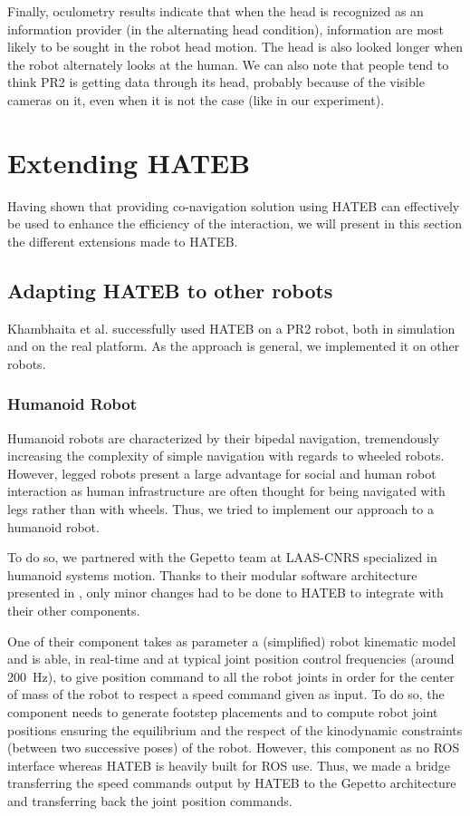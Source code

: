 \documentclass[a4paper,11pt,twoside]{StyleThese}
\begin{document}
Finally, oculometry results indicate that when the head is recognized as an information provider (in the alternating head condition), information are most likely to be sought in the robot head motion. The head is also looked longer when the robot alternately looks at the human. We can also note that people tend to think PR2 is getting data through its head, probably because of the visible cameras on it, even when it is not the case (like in our experiment).


\section{Extending HATEB}
Having shown that providing co-navigation solution using HATEB can effectively be used to enhance the efficiency of the interaction, we will present in this section the different extensions made to HATEB.

\subsection{Adapting HATEB to other robots}
Khambhaita et al. \cite{khambhaita_head-body_2016} successfully used HATEB on a PR2 robot, both in simulation and on the real platform. As the approach is general, we implemented it on other robots.

\subsubsection{Humanoid Robot}
Humanoid robots are characterized by their bipedal navigation, tremendously increasing the complexity of simple navigation with regards to wheeled robots. However, legged robots present a large advantage for social and human robot interaction as human infrastructure are often thought for being navigated with legs rather than with wheels. Thus, we tried to implement our approach to a humanoid robot.

To do so, we partnered with the Gepetto team at LAAS-CNRS specialized in humanoid systems motion. Thanks to their modular software architecture presented in \cite{stasse_modular_architecture_2008}, only minor changes had to be done to HATEB to integrate with their other components.

One of their component \cite{naveau_reactive_walking_2017} takes as parameter a (simplified) robot kinematic model and is able, in real-time and at typical joint position control frequencies (around 200~Hz), to give position command to all the robot joints in order for the center of mass of the robot to respect a speed command given as input. To do so, the component needs to generate footstep placements and to compute robot joint positions ensuring the equilibrium and the respect of the kinodynamic constraints (between two successive poses) of the robot. However, this component as no ROS interface whereas HATEB is heavily built for ROS use. Thus, we made a bridge transferring the speed commands output by HATEB to the Gepetto architecture and transferring back the joint position commands.
\end{document}
